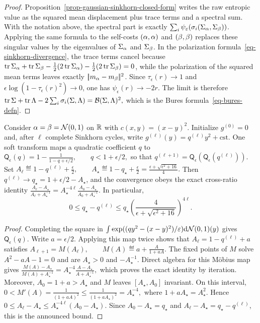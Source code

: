 \begin{proof}
Proposition~\ref{prop-gaussian-sinkhorn-closed-form} writes the raw entropic value as the squared mean displacement plus trace terms and a spectral sum. With the notation above, the spectral part is exactly $\sum_i\psi_\varepsilon(\sigma_i(\Sigma_\alpha,\Sigma_\beta))$. Applying the same formula to the self-costs $(\alpha,\alpha)$ and $(\beta,\beta)$ replaces these singular values by the eigenvalues of $\Sigma_\alpha$ and $\Sigma_\beta$. In the polarization formula~\eqref{eq-sinkhorn-divergence}, the trace terms cancel because
$\operatorname{tr}\Sigma_\alpha+\operatorname{tr}\Sigma_\beta-\frac12(2\operatorname{tr}\Sigma_\alpha)-\frac12(2\operatorname{tr}\Sigma_\beta)=0$, while the polarization of the squared mean terms leaves exactly $|\!| m_\alpha-m_\beta |\!|^2$. Since $\tau_\epsilon(r)\to1$ and $\epsilon\log(1-\tau_\epsilon(r)^2)\to0$, one has $\psi_\epsilon(r)\to-2r$. The limit is therefore
\(\operatorname{tr}\Sigma+\operatorname{tr}\Lambda -2\sum_i\sigma_i(\Sigma,\Lambda) = \mathcal{B}(\Sigma,\Lambda)^2,\)
which is the Bures formula~\eqref{eq-bures-defn}.
\end{proof}
\begin{prop}\label{prop-gaussian-sinkhorn-1d-rate}
Consider $\alpha=\beta=\mathcal{N}(0,1)$ on $\mathbb{R}$ with $c(x,y)=(x-y)^2$. Initialize $g^{(0)}=0$ and, after $\ell$ complete Sinkhorn cycles, write
\(g^{(\ell)}(y)=q^{(\ell)}y^2+\mathrm{cst}.\)
One soft transform maps a quadratic coefficient $q$ to
\(\mathsf Q_\epsilon(q) = 1-\frac{1}{1-q+\epsilon/2}, \qquad q<1+\epsilon/2,\)
so that $q^{(\ell+1)}=\mathsf Q_\epsilon(\mathsf Q_\epsilon(q^{(\ell)}))$. Set
\(A_\ell\eqdef 1-q^{(\ell)}+\frac{\epsilon}{2}, \qquad A_\star\eqdef 1-q_\star+\frac{\epsilon}{2} = \frac{\epsilon+\sqrt{\epsilon^2+16}}{4}.\)
Then $q^{(\ell)}\to q_\star=1+\epsilon/2-A_\star$, and the convergence obeys the exact cross-ratio identity
\(\frac{A_\ell-A_\star}{A_\ell+A_\star^{-1}} = A_\star^{-4\ell} \frac{A_0-A_\star}{A_0+A_\star^{-1}}.\)
In particular,
\[
0\leq q_\star-q^{(\ell)}
\leq
q_\star
\left(\frac{4}{\epsilon+\sqrt{\epsilon^2+16}}\right)^{4\ell}.
\]
\end{prop}
\begin{proof}
Completing the square in $\int\exp((q y^2-(x-y)^2)/\varepsilon)\mathrm{d}\mathcal{N}(0,1)(y)$ gives $\mathsf Q_\epsilon(q)$. Write $a=\epsilon/2$. Applying this map twice shows that $A_\ell=1-q^{(\ell)}+a$ satisfies
\(A_{\ell+1}=M(A_\ell), \qquad M(A)\eqdef a+\frac{A}{1+aA}.\)
The fixed points of $M$ solve $A^2-aA-1=0$ and are $A_\star>0$ and $-A_\star^{-1}$. Direct algebra for this M\"obius map gives \(\frac{M(A)-A_\star}{M(A)+A_\star^{-1}} = A_\star^{-4} \frac{A-A_\star}{A+A_\star^{-1}},\)
which proves the exact identity by iteration. Moreover, $A_0=1+a>A_\star$ and $M$ leaves $[A_\star,A_0]$ invariant. On this interval, \(0<M'(A)=\frac{1}{(1+aA)^2} \leq \frac{1}{(1+aA_\star)^2} =A_\star^{-4},\)
where $1+aA_\star=A_\star^2$. Hence $0\leq A_\ell-A_\star\leq A_\star^{-4\ell}(A_0-A_\star)$. Since $A_0-A_\star=q_\star$ and $A_\ell-A_\star=q_\star-q^{(\ell)}$, this is the announced bound.
\end{proof}
